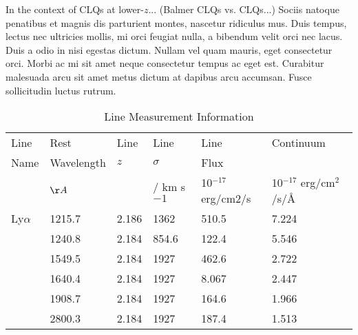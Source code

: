 \documentclass[a4paper,fleqn,usenatbib]{mnras}
\begin{document}
In the context of CLQs at lower-$z$...  
(Balmer CLQs vs. \civ CLQs...) 
Sociis natoque penatibus et
magnis dis parturient montes, nascetur ridiculus mus. Duis tempus,
lectus nec ultricies mollis, mi orci feugiat nulla, a bibendum velit
orci nec lacus. Duis a odio in nisi egestas dictum. Nullam vel quam
mauris, eget consectetur orci. Morbi ac mi sit amet neque consectetur
tempus ac eget est. Curabitur malesuada arcu sit amet metus dictum at
dapibus arcu accumsan. Fusce sollicitudin luctus rutrum.  


\begin{table*}
  \centering
  \begin{tabular}{l  l  l    lll}
    \hline \hline 
    Line 	    &   Rest	      & Line       & Line	       &	Line			                 &   Continuum \\ 
    Name	    &   Wavelength  &  $z$       & $\sigma$ 	&	Flux			                 & \\
                    &    $\AA $        &              & /  km s$-1$	&     10$^{-17}$ erg/cm$2$/s &  10$^{-17}$ erg/cm$^2$/s/\AA  \\
Ly$\alpha$  &	 1215.7	&	2.186      &	1362	&	510.5		                &	7.224 \\
\nv		    &   1240.8	&	2.184     &	 854.6	&	122.4	                    	&	5.546 \\ 
\civ		    &  1549.5	&	2.184    &	1927	&	462.6		                &	2.722 \\ 
\heii	    &	 1640.4	&	2.184    &	1927	&    	  8.067	                   	&	2.447 \\  
\ciii 	    &	 1908.7	&	2.184    &	1927	&	164.6	                   	&	1.966  \\ 
\mgii	    &	 2800.3	&	2.184   & 	1927	&	187.4	                   	&	1.513  \\
   \hline \hline   
  \end{tabular}
  \caption{Line Measurement Information}
 \label{tab:line_values}
\end{table*}
\end{document}
